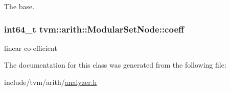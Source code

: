 The base. 

\subsubsection[{\texorpdfstring{coeff}{coeff}}]{\setlength{\rightskip}{0pt plus 5cm}int64\+\_\+t tvm\+::arith\+::\+Modular\+Set\+Node\+::coeff}\hypertarget{classtvm_1_1arith_1_1ModularSetNode_a0531d08d8529454c726a9a20a2002ee6}{}\label{classtvm_1_1arith_1_1ModularSetNode_a0531d08d8529454c726a9a20a2002ee6}


linear co-\/efficient 



The documentation for this class was generated from the following file\+:\begin{DoxyCompactItemize}
\item 
include/tvm/arith/\hyperlink{analyzer_8h}{analyzer.\+h}\end{DoxyCompactItemize}
